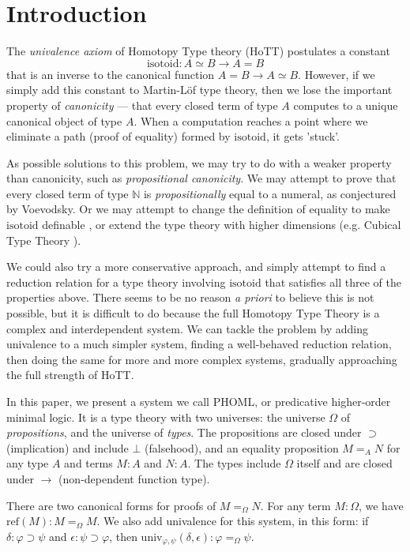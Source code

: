 \documentclass[a4paper,UKenglish]{lipics-v2016}
\newcommand*{\isotoid}{\ensuremath{\mathrm{isotoid}}}
\newcommand*{\reff}[1]{\ensuremath{\mathrm{ref} \left( {#1} \right)}}
\newcommand*{\univ}[4]{\ensuremath{\mathrm{univ}_{{#1}, {#2}} \left({#3} , {#4} \right)}}
\theoremstyle{plain}
\theoremstyle{definition}
\begin{document}
\section{Introduction}


The \emph{univalence axiom} of Homotopy Type theory (HoTT) \cite{hottbook} postulates a
constant
\[ \isotoid : A \simeq B \rightarrow A = B \]
that is an inverse to the canonical function $A = B \rightarrow A \simeq B$.  However, if we simply add this constant to Martin-L\"{o}f type theory, then
we lose the important property of \emph{canonicity} --- that every closed term of type $A$ computes to a unique canonical object of type $A$.  When a computation reaches a point
where we eliminate a path (proof of equality) formed by $\isotoid$, it gets 'stuck'.

As possible solutions to this problem, we may try to do with a weaker property than canonicity, such as \emph{propositional canonicity}.
We may attempt to prove that every closed term of type $\mathbb{N}$ is \emph{propositionally} equal to a numeral, as conjectured by Voevodsky.  Or we may attempt to change the definition of equality to make $\isotoid$ definable \cite{Polonsky14a}, or extend the type theory with higher dimensions (e.g. Cubical Type Theory \cite{cchm:cubical}).

We could also try a more conservative approach, and simply attempt to find a reduction relation for a type theory involving $\isotoid$ that satisfies
all three of the properties above.  There seems to be no reason \emph{a priori} to believe this is not possible, but it is difficult to do because
the full Homotopy Type Theory is a complex and interdependent system.  We can tackle the problem by adding univalence to a much simpler system, finding
a well-behaved reduction relation, then doing the same for more and more complex systems, gradually approaching the full strength of HoTT.

In this paper, we present a system we call PHOML, or predicative higher-order minimal logic.  It is a type theory with two universes: the universe $\Omega$
of \emph{propositions}, and the universe of \emph{types}.  The propositions are closed under $\supset$ (implication) and include $\bot$ (falsehood), and an equality proposition $M =_A N$ for
any type $A$ and terms $M : A$ and $N : A$.  The types include $\Omega$ itself and are closed under $\rightarrow$ (non-dependent function type).

There are two canonical forms for proofs of $M =_\Omega N$.  For any term $M : \Omega$, we have $\reff{M} : M =_\Omega M$.  We also add univalence for this system, in this form:
if $\delta : \varphi \supset \psi$ and $\epsilon : \psi \supset\varphi$, then $\univ{\varphi}{\psi}{\delta}{\epsilon} : \varphi =_\Omega \psi$.  
\end{document}
